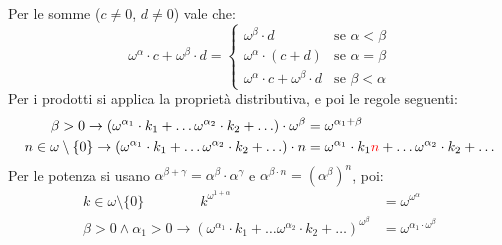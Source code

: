 \begin{proposition}
	Per le somme ($c \ne 0$, $d \ne 0$) vale che:
	\[ \omega^{\alpha} \cdot c + \omega^\beta \cdot d = \begin{cases}
		\omega^\beta \cdot d &\text{se $\alpha < \beta$} \\
		\omega^\alpha \cdot (c + d) &\text{se $\alpha = \beta$} \\
		\omega^{\alpha} \cdot c + \omega^\beta \cdot d &\text{se $\beta < \alpha$}
	\end{cases}
		\]
	Per i prodotti si applica la proprietà distributiva, e poi le regole seguenti:
	\begin{align*}
		\beta > 0 \rightarrow (\omega^{\alpha_1} \cdot k_1 + \ldots \omega^{\alpha_2} \cdot k_2 + \ldots) \cdot \omega^{\beta} &= \omega^{\alpha_1 + \beta} \\
		n \in \omega\setminus\{0\} \rightarrow (\omega^{\alpha_1} \cdot k_1 + \ldots \omega^{\alpha_2} \cdot k_2 + \ldots) \cdot n &= \omega^{\alpha_1} \cdot k_1\textcolor{red}{n} + \ldots \omega^{\alpha_2} \cdot k_2 + \ldots
	\end{align*}
	Per le potenza si usano $\alpha^{\beta + \gamma} = \alpha^\beta \cdot \alpha^\gamma$ e $\alpha^{\beta \cdot n} = (\alpha^\beta)^n$, poi:
	\begin{align*}
		k \in \omega\setminus\{0\}\qquad\qquad k^{\omega^{1 + \alpha}} &= \omega^{\omega^{\alpha}} \\
		\beta > 0 \land \alpha_1 > 0 \rightarrow (\omega^{\alpha_1} \cdot k_1 + \ldots \omega^{\alpha_2} \cdot k_2 + \ldots)^{\omega^\beta} &= \omega^{\alpha_1 \cdot \omega^\beta}
	\end{align*}
\end{proposition}

